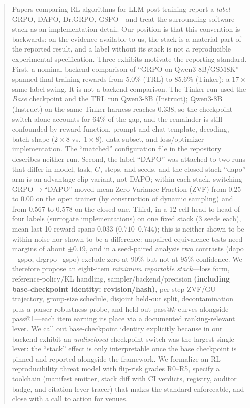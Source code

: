 \begin{abstract}
Papers comparing RL algorithms for LLM post-training report a \emph{label}---GRPO,
DAPO, Dr.GRPO, GSPO---and treat the surrounding software stack as an
implementation detail. Our position is that this convention is backwards: on the
evidence available to us, the stack is a material part of the reported result,
and a label without its stack is not a reproducible experimental
specification. Three exhibits motivate the reporting standard. First, a
nominal backend comparison of ``GRPO on Qwen3-8B/GSM8K'' spanned final training
rewards from $5.0\%$ (TRL) to $85.6\%$ (Tinker): a $17\times$ same-label swing.
It is not a backend comparison. The Tinker run used the \emph{Base} checkpoint
and the TRL run Qwen3-8B (Instruct); Qwen3-8B (Instruct) on the same Tinker
harness reaches $0.338$, so the checkpoint switch alone accounts
for $64\%$ of the gap, and the remainder is still confounded by reward function,
prompt and chat template, decoding, batch shape ($2{\times}8$ vs.\ $1{\times}8$),
data subset, and loss/optimizer implementation. The ``matched'' configuration
file in the repository describes neither run. Second, the label ``DAPO'' was
attached to two runs that differ in model, task, $G$, steps, and seeds, and the
closed-stack ``dapo'' arm is an advantage-clip variant, not DAPO; within each
stack, switching GRPO$\to$``DAPO'' moved mean Zero-Variance Fraction (ZVF) from
$0.25$ to $0.00$ on the open trainer (by construction of dynamic sampling) and
from $0.567$ to $0.578$ on the closed one. Third, in a 12-cell head-to-head of
four labels (surrogate implementations) on one fixed stack (3 seeds each), mean last-10 reward spans
$0.033$ ($0.710$--$0.744$); this is neither shown to be within noise nor shown
to be a difference: unpaired equivalence tests need margins of about $\pm0.19$, and in a
seed-paired analysis two contrasts (dapo$-$gspo, drgrpo$-$gspo) exclude zero at
90\% but not at 95\% confidence. We therefore
propose an eight-item \emph{minimum reportable
stack}---loss form, reference-policy/KL handling, sampler/backend/precision
\textbf{(including base-checkpoint identity: revision/hash)}, per-step ZVF/GU
trajectory, group-size schedule, disjoint held-out split,
decontamination plus a parser-robustness probe, and held-out pass@$k$
curves alongside pass@1---each item earning its place via a
documented ranking-relevant lever. We call out base-checkpoint identity explicitly
because in our backend exhibit an \emph{undisclosed} checkpoint switch was the
largest single lever: the ``stack'' effect is only interpretable once the base
checkpoint is pinned and reported alongside the framework. We formalize an RL-reproducibility threat
model with flip-risk grades R0--R5, specify a toolchain (manifest emitter, stack
diff with CI verdicts, registry, auditor badge, and citation-lever tracer) that
makes the standard enforceable, and close with a call to action for venues.
\end{abstract}
